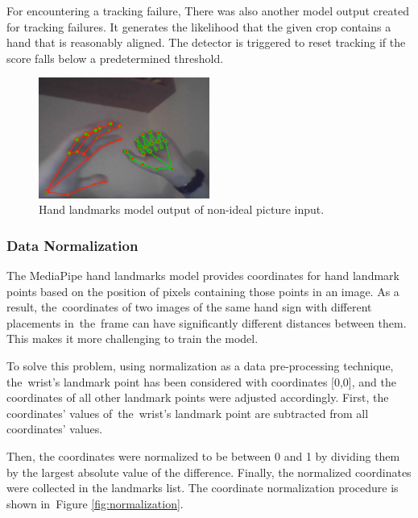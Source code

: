 For encountering a tracking failure, There was also another model output created for tracking failures. It generates the likelihood that the given crop contains a hand that is reasonably aligned. The detector is triggered to reset tracking if the score falls below a predetermined threshold.

\begin{figure}
	\centering
	\includegraphics[width = 0.5\textwidth]{images/landmarks_both_hands.png}
	\caption{Hand landmarks model output of non-ideal picture input.}
	\label{fig:landmark_both_hands}
\end{figure}


\subsubsection*{Data Normalization}\label{sec:norm}
The MediaPipe hand landmarks model provides coordinates for hand landmark points based on the position of pixels containing those points in an image. As a result, the~coordinates of two images of the same hand sign with different placements in~the~frame can have significantly different distances between them. This makes it more challenging to train the model.

To solve this problem, using normalization as a data pre-processing technique, the~wrist's landmark point has been considered with coordinates [0,0], and the coordinates of all other landmark points were adjusted accordingly.
First, the coordinates' values of~the~wrist's landmark point are subtracted from all coordinates' values.

Then, the coordinates were normalized to be between 0 and 1 by dividing them by the largest absolute value of the difference. Finally, the normalized coordinates were collected in the landmarks list. The coordinate normalization procedure is shown in~Figure \ref{fig:normalization}.


